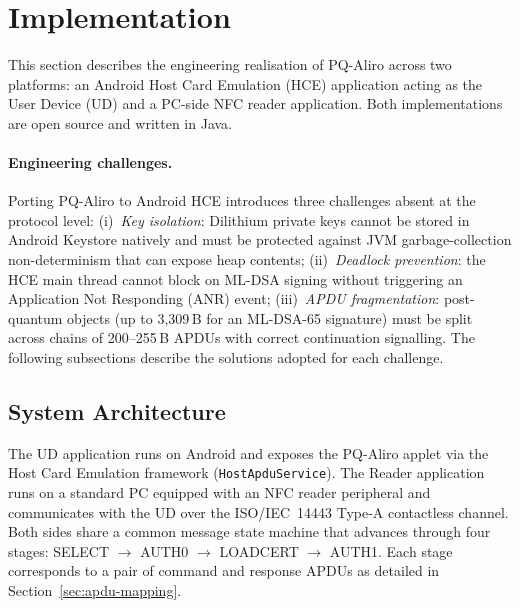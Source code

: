 \documentclass[runningheads]{llncs}
\begin{document}
\section{Implementation}
\label{sec:implementation}

This section describes the engineering realisation of PQ-Aliro across two
platforms: an Android Host Card Emulation (HCE) application acting as the User
Device (UD) and a PC-side NFC reader application.
Both implementations are open source and written in Java.

\paragraph{Engineering challenges.}
{\sloppy
Porting PQ-Aliro to Android HCE introduces three challenges absent at the
protocol level:
(i)~\emph{Key isolation}: Dilithium private keys cannot be stored in Android
Keystore natively and must be protected against JVM garbage-collection
non-determinism that can expose heap contents;
(ii)~\emph{Deadlock prevention}: the HCE main thread cannot block on ML-DSA
signing without triggering an Application Not Responding (ANR) event;
(iii)~\emph{APDU fragmentation}: post-quantum objects (up to 3{,}309\,B for
an ML-DSA-65 signature) must be split across chains of 200--255\,B APDUs
with correct continuation signalling.
The following subsections describe the solutions adopted for each challenge.
\par}

\subsection{System Architecture}
\label{sec:impl:arch}

The UD application runs on Android and exposes the PQ-Aliro applet via the
Host Card Emulation framework (\texttt{HostApduService}).
The Reader application runs on a standard PC equipped with an NFC reader
peripheral and communicates with the UD over the ISO/IEC~14443 Type-A
contactless channel.
Both sides share a common message state machine that advances through four
stages: SELECT $\to$ AUTH0 $\to$ LOADCERT $\to$ AUTH1\@.
Each stage corresponds to a pair of command and response APDUs as detailed in
Section~\ref{sec:apdu-mapping}.
\end{document}
